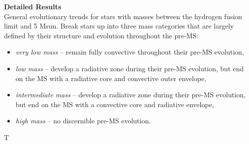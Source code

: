 \textbf{Detailed Results} \\
General evolutionary trends for stars with masses between the hydrogen fusion limit and 5 Msun. Break stars up into three mass categories that are largely defined by their structure and evolution throughout the pre-MS: 
\begin{itemize}
 \item {\it very low mass} -- remain fully convective throughout their pre-MS evolution,
 \item {\it low mass} -- develop a radiative zone during their pre-MS evolution, but end on the MS with a radiative core and convective outer envelope,
 \item {\it intermediate mass} -- develop a radiative zone during their pre-MS evolution, but end on the MS with a convective core and radiative envelope,
 \item {\it high mass} -- no discernible pre-MS evolution.
\end{itemize}
T